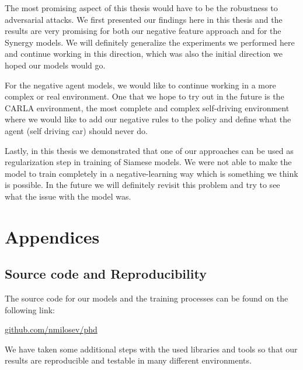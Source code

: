 \documentclass[b5paper]{book}
\newcommand{\skica}[1]{
    \noindent \framebox{\parbox[c]{0.9\textwidth}{  {\small** {#1}  }}
    \newline }
}
\begin{document}
The most promising aspect of this thesis would have to be the robustness to adversarial attacks. We first presented our findings here in this thesis and the results are very promising for both our negative feature approach and for the Synergy models. We will definitely generalize the experiments we performed here and continue working in this direction, which was also the initial direction we hoped our models would go.

For the negative agent models, we would like to continue working in a more complex or real environment. One that we hope to try out in the future is the CARLA environment, the most complete and complex self-driving environment where we would like to add our negative rules to the policy and define what the agent (self driving car) should never do.

Lastly, in this thesis we demonstrated that one of our approaches can be used as regularization step in training of Siamese models. We were not able to make the model to train completely in a negative-learning way which is something we think is possible. In the future we will definitely revisit this problem and try to see what the issue with the model was.

\part{Appendices}
\chapter{Source code and Reproducibility}
\label{source}

The source code for our models and the training processes can be found on the following link: 

\begin{footnotesize}
\url{github.com/nmilosev/phd}
\end{footnotesize}

We have taken some additional steps with the used libraries and tools so that our results are reproducible and testable in many different environments.

\backmatter


{
  \raggedright
  \printbibliography[heading=bibintoc]
}

\end{document}
